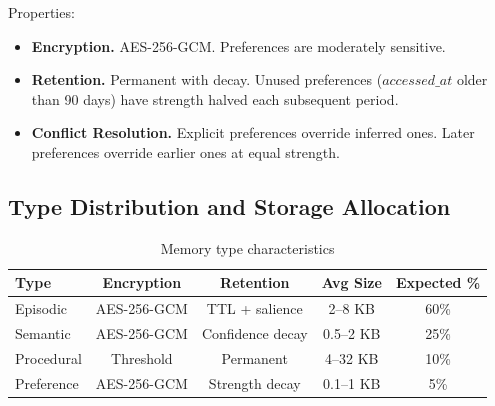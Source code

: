 Properties:
\begin{itemize}
    \item \textbf{Encryption.} AES-256-GCM. Preferences are moderately sensitive.
    \item \textbf{Retention.} Permanent with decay. Unused preferences ($\textit{accessed\_at}$ older than 90 days) have strength halved each subsequent period.
    \item \textbf{Conflict Resolution.} Explicit preferences override inferred ones. Later preferences override earlier ones at equal strength.
\end{itemize}

\subsection{Type Distribution and Storage Allocation}

\begin{table}[h]
\centering
\begin{tabular}{lcccc}
\toprule
\textbf{Type} & \textbf{Encryption} & \textbf{Retention} & \textbf{Avg Size} & \textbf{Expected \%} \\
\midrule
Episodic & AES-256-GCM & TTL + salience & 2--8 KB & 60\% \\
Semantic & AES-256-GCM & Confidence decay & 0.5--2 KB & 25\% \\
Procedural & Threshold & Permanent & 4--32 KB & 10\% \\
Preference & AES-256-GCM & Strength decay & 0.1--1 KB & 5\% \\
\bottomrule
\end{tabular}
\caption{Memory type characteristics}
\label{tab:memory_types}
\end{table}

